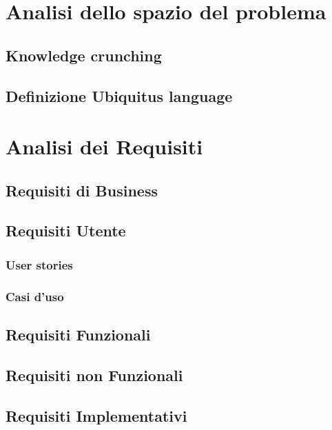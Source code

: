 \chapter{Analisi dello spazio del problema}
	\section{Knowledge crunching}	
	\section{Definizione Ubiquitus language}	

\chapter{Analisi dei Requisiti}
	\section{Requisiti di Business}
	\section{Requisiti Utente}
        \subsection{User stories}
	    \subsection{Casi d'uso}
	\section{Requisiti Funzionali}
	\section{Requisiti non Funzionali}
	\section{Requisiti Implementativi}
